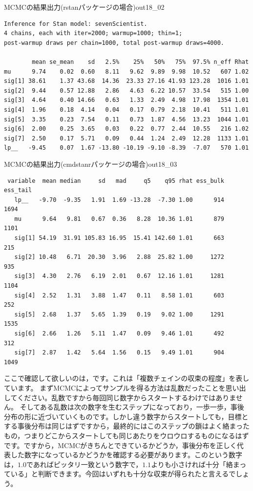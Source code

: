 \documentclass{ltjsbook}
\begin{document}
\begin{SCrstan}{MCMCの結果出力(rstanパッケージの場合)}{out18_02}
    \begin{verbatim}
Inference for Stan model: sevenScientist.
4 chains, each with iter=2000; warmup=1000; thin=1; 
post-warmup draws per chain=1000, total post-warmup draws=4000.

        mean se_mean    sd   2.5%    25%   50%   75%  97.5% n_eff Rhat
mu      9.74    0.02  0.60   8.11   9.62  9.89  9.98  10.52   607 1.02
sig[1] 38.61    1.37 43.68  14.36  23.33 27.16 41.93 123.28  1016 1.01
sig[2]  9.44    0.57 12.88   2.86   4.63  6.22 10.57  33.54   515 1.00
sig[3]  4.64    0.40 14.66   0.63   1.33  2.49  4.98  17.98  1354 1.01
sig[4]  1.96    0.18  4.14   0.04   0.17  0.79  2.18  10.41   511 1.01
sig[5]  3.35    0.23  7.54   0.11   0.73  1.87  4.56  13.23  1044 1.01
sig[6]  2.00    0.25  3.65   0.03   0.22  0.77  2.44  10.55   216 1.02
sig[7]  2.50    0.17  5.71   0.09   0.44  1.24  2.49  12.28  1133 1.01
lp__   -9.45    0.07  1.67 -13.80 -10.19 -9.10 -8.39  -7.07   570 1.01
    \end{verbatim}
\end{SCrstan}

\begin{SCcmd}{MCMCの結果出力(cmdstanrパッケージの場合)}{out18_03}
    \begin{verbatim}
 variable  mean median     sd   mad     q5    q95 rhat ess_bulk ess_tail
   lp__   -9.70  -9.35   1.91  1.69 -13.28  -7.30 1.00      914     1694
   mu      9.64   9.81   0.67  0.36   8.28  10.36 1.01      879     1101
   sig[1] 54.19  31.91 105.83 16.95  15.41 142.60 1.01      663      215
   sig[2] 10.48   6.71  20.30  3.96   2.88  25.82 1.00     1272      935
   sig[3]  4.30   2.76   6.19  2.01   0.67  12.16 1.01     1281     1104
   sig[4]  2.52   1.31   3.88  1.47   0.11   8.58 1.01      603      252
   sig[5]  2.68   1.37   5.65  1.39   0.19   9.02 1.00     1291     1535
   sig[6]  2.66   1.26   5.11  1.47   0.09   9.46 1.01      492      312
   sig[7]  2.87   1.42   5.64  1.56   0.15   9.49 1.01      904     1049
    \end{verbatim}
\end{SCcmd}

ここで確認して欲しいのは，です。これは「複数チェインの収束の程度」を表しています。
まずMCMCによってサンプルを得る方法は乱数だったことを思い出してください。乱数ですから毎回同じ数字からスタートするわけではありません。
そしてある乱数は次の数字を生むステップになっており，一歩一歩，事後分布の形に近づいていくものです。しかし違う数字からスタートしても，目標とする事後分布は同じはずですから，最終的にはこのステップの鎖はよく絡まったもの，つまりどこからスタートしても同じあたりをウロウロするものになるはずです。ですから，MCMCがきちんとできているかどうか，事後分布を正しく代表した数字になっているかどうかを確認する必要があります。このという数字は，$1.0$であればピッタリ一致という数字で，$1.1$よりも小さければ十分「絡まっている」と判断できます。今回はいずれも十分な収束が得られたと言えるでしょう。
\end{document}
